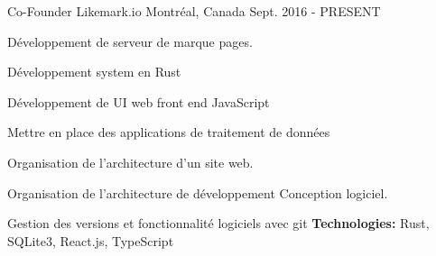 \begin{cventries}
  \cventry
    {Co-Founder}
    {Likemark.io}
    {Montréal, Canada}
    {Sept. 2016 - PRESENT}
    {
      \begin{cvitems}
        \item {Développement de serveur de marque pages.}
        \item {Développement system en Rust}
        \item {Développement de UI web front end JavaScript}
        \item {Mettre en place des applications de traitement de données}
        \item {Organisation de l’architecture d’un site web.}
        \item {Organisation de l’architecture de développement
        Conception logiciel.}
        \item {Gestion des versions et fonctionnalité logiciels avec git}
        \newline
        \vspace{3mm}
        \textbf{Technologies: }{ Rust, SQLite3, React.js, TypeScript}
      \end{cvitems}
    }
\end{cventries}
\vspace{5mm}
